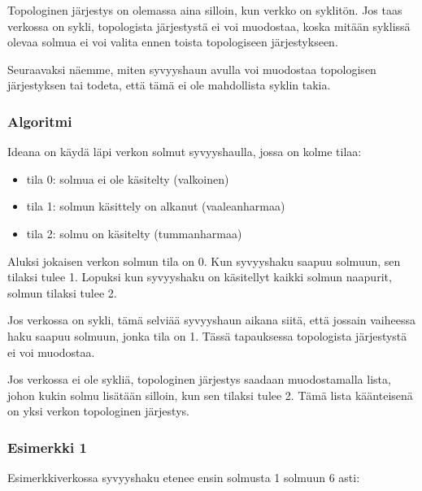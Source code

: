 Topologinen järjestys on olemassa
aina silloin, kun verkko on syklitön.
Jos taas verkossa on sykli,
topologista järjestystä ei voi muodostaa,
koska mitään syklissä olevaa solmua ei voi
valita ennen toista topologiseen järjestykseen.

Seuraavaksi näemme, miten syvyyshaun avulla
voi muodostaa topologisen järjestyksen tai
todeta, että tämä ei ole mahdollista syklin takia.

\subsubsection{Algoritmi}

Ideana on käydä läpi verkon solmut syvyyshaulla,
jossa on kolme tilaa:

\begin{itemize}
\item tila 0: solmua ei ole käsitelty (valkoinen)
\item tila 1: solmun käsittely on alkanut (vaaleanharmaa)
\item tila 2: solmu on käsitelty (tummanharmaa)
\end{itemize}

Aluksi jokaisen verkon solmun tila on 0.
Kun syvyyshaku saapuu solmuun, sen tilaksi tulee 1.
Lopuksi kun syvyyshaku on käsitellyt kaikki
solmun naapurit, solmun tilaksi tulee 2.

Jos verkossa on sykli, tämä selviää syvyyshaun aikana siitä,
että jossain vaiheessa haku saapuu solmuun,
jonka tila on 1. Tässä tapauksessa topologista
järjestystä ei voi muodostaa.

Jos verkossa ei ole sykliä, topologinen järjestys
saadaan muodostamalla lista, johon kukin solmu lisätään
silloin, kun sen tilaksi tulee 2.
Tämä lista käänteisenä on yksi verkon
topologinen järjestys.

\subsubsection{Esimerkki 1}

Esimerkkiverkossa syvyyshaku etenee ensin solmusta 1
solmuun 6 asti:

\begin{center}
\end{center}

